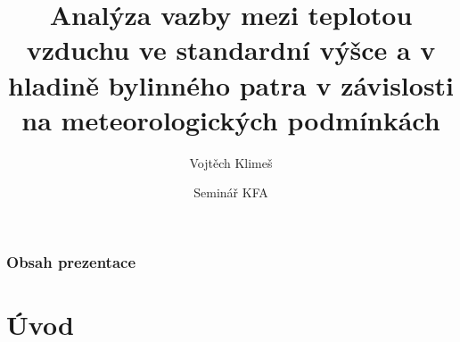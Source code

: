\documentclass[
	11pt, %
]{beamer}
\title[]{Analýza vazby mezi teplotou vzduchu ve standardní výšce a v hladině bylinného patra v závislosti na meteorologických podmínkách} %
\author[]{Vojtěch Klimeš} %
\institute[MFF UK]{Univerzita Karlova} %
\date[12.4.2023]{Seminář KFA} %
\begin{document}

\begin{frame}
	\titlepage %
\end{frame}



\begin{frame}
	\frametitle{Obsah prezentace} %
	
	\tableofcontents %
\end{frame}


\section{Úvod} %
\end{document}
